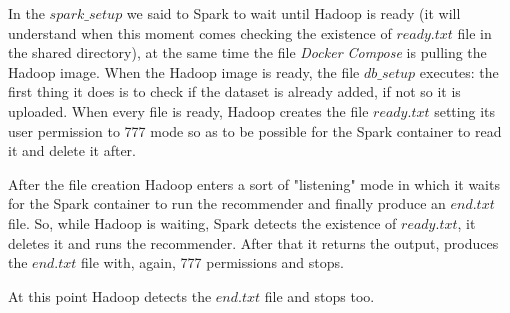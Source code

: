 \documentclass[11pt,a4paper,titlepage]{article}
\begin{document}
In the $spark\_setup$ we said to Spark to wait until Hadoop is ready (it will understand when this moment comes checking the existence of $ready.txt$ file in the shared directory), at the same time the file \textit{Docker Compose} is pulling the Hadoop image. When the Hadoop image is ready, the file $db\_setup$ executes: the first thing it does is to check if the dataset is already added, if not so it is uploaded. When every file is ready, Hadoop creates the file $ready.txt$ setting its user permission to 777 mode so as to be possible for the Spark container to read it and delete it after.

After the file creation Hadoop enters a sort of "listening" mode in which it waits for the Spark container to run the recommender and finally produce an $end.txt$ file.
So, while Hadoop is waiting, Spark detects the existence of $ready.txt$, it deletes it and runs the recommender. After that it returns the output, produces the $end.txt$ file with, again, 777 permissions and stops.

At this point Hadoop detects the $end.txt$ file and stops too.

\end{document}
